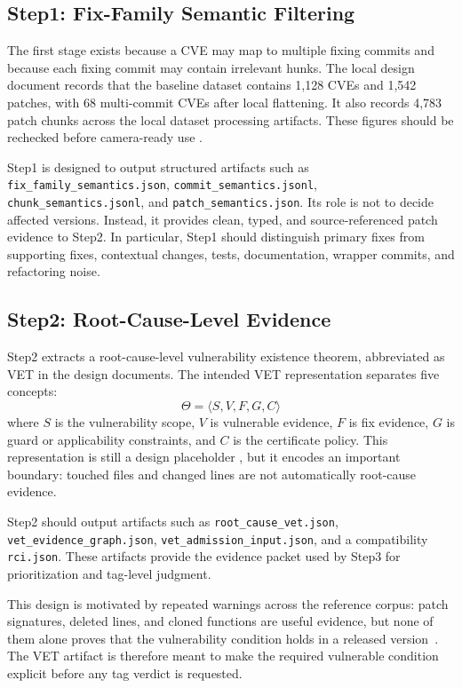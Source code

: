 \subsection{Step1: Fix-Family Semantic Filtering}

The first stage exists because a CVE may map to multiple fixing commits and because each fixing commit may contain irrelevant hunks. The local design document records that the baseline dataset contains 1,128 CVEs and 1,542 patches, with 68 multi-commit CVEs after local flattening. It also records 4,783 patch chunks across the local dataset processing artifacts. These figures should be rechecked before camera-ready use .

Step1 is designed to output structured artifacts such as \texttt{fix\_family\_semantics.json}, \texttt{commit\_semantics.jsonl}, \texttt{chunk\_semantics.jsonl}, and \texttt{patch\_semantics.json}. Its role is not to decide affected versions. Instead, it provides clean, typed, and source-referenced patch evidence to Step2. In particular, Step1 should distinguish primary fixes from supporting fixes, contextual changes, tests, documentation, wrapper commits, and refactoring noise.

\subsection{Step2: Root-Cause-Level Evidence}

Step2 extracts a root-cause-level vulnerability existence theorem, abbreviated as VET in the design documents. The intended VET representation separates five concepts:
\[
\Theta = \langle S, V, F, G, C \rangle
\]
where $S$ is the vulnerability scope, $V$ is vulnerable evidence, $F$ is fix evidence, $G$ is guard or applicability constraints, and $C$ is the certificate policy. This representation is still a design placeholder , but it encodes an important boundary: touched files and changed lines are not automatically root-cause evidence.

Step2 should output artifacts such as \texttt{root\_cause\_vet.json}, \texttt{vet\_evidence\_graph.json}, \texttt{vet\_admission\_input.json}, and a compatibility \texttt{rci.json}. These artifacts provide the evidence packet used by Step3 for prioritization and tag-level judgment.

This design is motivated by repeated warnings across the reference corpus: patch signatures, deleted lines, and cloned functions are useful evidence, but none of them alone proves that the vulnerability condition holds in a released version~\cite{vszz2022,redebug2012,vuddy2017,movery2022,vercation2026}. The VET artifact is therefore meant to make the required vulnerable condition explicit before any tag verdict is requested.

